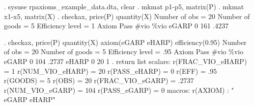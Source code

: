 . sysuse rpaxioms_example_data.dta, clear
{\smallskip}
. mkmat p1-p5, matrix(P)
{\smallskip}
. mkmat x1-x5, matrix(X)
. checkax, price(P) quantity(X)
{\smallskip}
              Number of obs           =      20 
              Number of goods         =       5 
              Efficiency level        =       1 
{\smallskip}
       Axiom {\VBAR}      Pass       \#vio       \%vio 
       eGARP {\VBAR}         0        161      .4237 
{\smallskip}

. checkax, price(P) quantity(X) axiom(eGARP eHARP) efficiency(0.95)
{\smallskip}
              Number of obs           =      20 
              Number of goods         =       5 
              Efficiency level        =     .95 
{\smallskip}
       Axiom {\VBAR}      Pass       \#vio       \%vio 
       eGARP {\VBAR}         0        104      .2737 
       eHARP {\VBAR}         0         20          1 
{\smallskip}
. return list
{\smallskip}
scalars:
     r(FRAC_VIO_eHARP) =  1
      r(NUM_VIO_eHARP) =  20
         r(PASS_eHARP) =  0
                r(EFF) =  .95
              r(GOODS) =  5
                r(OBS) =  20
     r(FRAC_VIO_eGARP) =  .2737
      r(NUM_VIO_eGARP) =  104
         r(PASS_eGARP) =  0
{\smallskip}
macros:
              r(AXIOM) : " eGARP eHARP"

